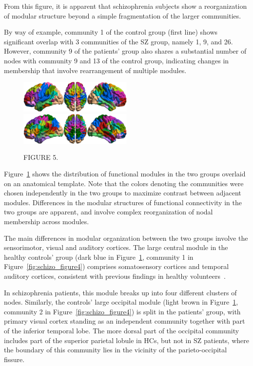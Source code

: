 From this figure, it is apparent that schizophrenia subjects show a reorganization of modular structure beyond a simple fragmentation of the larger communities.

By way of example, community 1 of the control group (first line) shows significant overlap with 3 communities of the SZ group, namely 1, 9, and 26. 
However, community 9 of the patients' group also shares a substantial number of nodes with community 9 and 13 of the control group, indicating changes in membership that involve rearrangement of multiple modules. 


\begin{figure}
\centering
\includegraphics[width=0.5\textwidth]{images/schizo/schizo_fig_5a.jpg}
\includegraphics[width=0.5\textwidth]{images/schizo/schizo_fig_5b.jpg}
\caption{FIGURE 5.}
\label{fig:schizo_figure5}
\end{figure}

Figure~\ref{fig:schizo_figure5} shows the distribution of functional modules in the two groups overlaid on an anatomical template.
Note that the colors denoting the communities were chosen independently in the two groups to maximize contrast between adjacent modules.
Differences in the modular structures of functional connectivity in the two groups are apparent, and involve complex reorganization of nodal membership across modules. 

The main differences in modular organization between the two groups involve the sensorimotor, visual and auditory cortices.
The large central module in the healthy controls' group (dark blue in Figure~\ref{fig:schizo_figure5}, community 1 in Figure~\ref{fig:schizo_figure4}) comprises somatosensory cortices and temporal auditory cortices, consistent with previous findings in healthy volunteers~.

In schizophrenia patients, this module breaks up into four different clusters of nodes.
Similarly, the controls' large occipital module (light brown in Figure~\ref{fig:schizo_figure5}, community 2 in Figure~\ref{fig:schizo_figure4}) is split in the patients' group, with primary visual cortex standing as an independent community together with part of the inferior temporal lobe.
The more dorsal part of the occipital community includes part of the superior parietal lobule in HCs, but not in SZ patients, where the boundary of this community lies in the vicinity of the parieto-occipital fissure.

